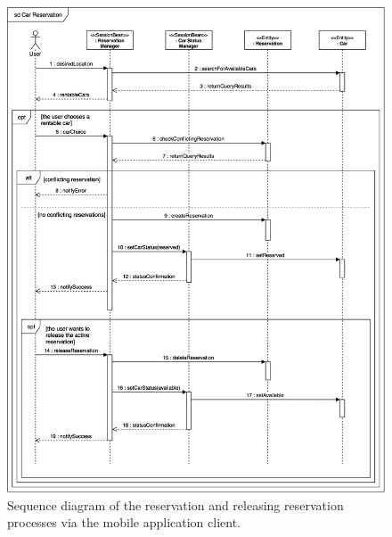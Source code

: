 \begin{figure}[H]
\begin{center}
		\includegraphics[width=\textwidth]{./arch_design/diagrams/car_reservation_sd.png}
		\caption{Sequence diagram of the reservation and releasing reservation processes via the mobile application client.}
		\label{reservation_sd}
\end{center}
\end{figure}

